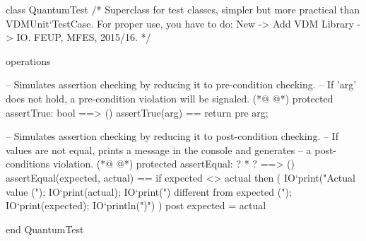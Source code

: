 \begin{vdmpp}[breaklines=true]
class QuantumTest
/*
  Superclass for test classes, simpler but more practical than VDMUnit`TestCase. 
  For proper use, you have to do: New -> Add VDM Library -> IO.
  FEUP, MFES, 2015/16.
*/

operations

 -- Simulates assertion checking by reducing it to pre-condition checking.
 -- If 'arg' does not hold, a pre-condition violation will be signaled.
(*@
\label{assertTrue:12}
@*)
 protected assertTrue: bool ==> ()
 assertTrue(arg) == 
  return 
 pre arg;
  
 -- Simulates assertion checking by reducing it to post-condition checking.
 -- If values are not equal, prints a message in the console and generates 
 -- a post-conditions violation.
(*@
\label{assertEqual:20}
@*)
 protected assertEqual: ? * ? ==> ()
 assertEqual(expected, actual) == 
  if expected <> actual then (
    IO`print("Actual value (");
    IO`print(actual); 
    IO`print(") different from expected (");
    IO`print(expected);
    IO`println(")\n")
  )
 post expected = actual
  
end QuantumTest
\end{vdmpp}
